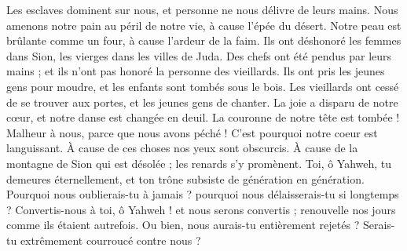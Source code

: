 \begin{multicols}{2}
Les esclaves dominent sur nous, et personne ne nous délivre de leurs mains.
Nous amenons notre pain au péril de notre vie, à cause l’épée du désert.
Notre peau est brûlante comme un four, à cause l’ardeur de la faim.
Ils ont déshonoré les femmes dans Sion, les vierges dans les villes de Juda.
Des chefs ont été pendus par leurs mains ; et ils n'ont pas honoré la personne des vieillards.
Ils ont pris les jeunes gens pour moudre, et les enfants sont tombés sous le bois.
Les vieillards ont cessé de se trouver aux portes, et les jeunes gens de chanter.
La joie a disparu de notre cœur, et notre danse est changée en deuil.
La couronne de notre tête est tombée ! Malheur à nous, parce que nous avons péché !
C’est pourquoi notre coeur est languissant. À cause de ces choses nos yeux sont obscurcis.
À cause de la montagne de Sion qui est désolée ; les renards s'y promènent.
Toi, ô Yahweh, tu demeures éternellement, et ton trône subsiste de génération en génération.
Pourquoi nous oublierais-tu à jamais ? pourquoi nous délaisserais-tu si longtemps ?
Convertis-nous à toi, ô Yahweh ! et nous serons convertis ; renouvelle nos jours comme ils étaient autrefois.
Ou bien, nous aurais-tu entièrement rejetés ? Serais-tu extrêmement courroucé contre nous ?
\PPE{}
\end{multicols}
